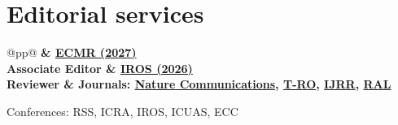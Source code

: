 \documentclass[11pt,a4paper]{article}
\newlength{\colone}
\newlength{\coltwo}
\begin{document}
\section{Editorial services}
\begin{longtable}{@{}p{\colone}p{\coltwo}@{}}
	\bfseries {}
		& \href{https://ecmr2027.gr/}{ECMR (2027)} \\
	\bfseries Associate Editor
		& \href{https://2026.ieee-iros.org/}{IROS (2026)} \\
	\bfseries Reviewer
		& Journals: 
			\href{https://www.scimagojr.com/journalsearch.php?q=19700182758&tip=sid}{Nature Communications},
			\href{https://www.scimagojr.com/journalsearch.php?q=95101&tip=sid}{T-RO},
			\href{https://www.scimagojr.com/journalsearch.php?q=18050&tip=sid}{IJRR},
			\href{https://www.scimagojr.com/journalsearch.php?q=21100900379&tip=sid}{RAL} \par
		Conferences: RSS, ICRA, IROS, ICUAS, ECC
\end{longtable}


\end{document}
